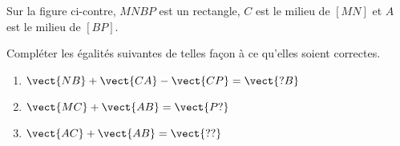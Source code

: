 
\begin{exercice}\label{exosmath-0297}

    \begin{multicols}{2}
        Sur la figure ci-contre, \( MNBP\) est un rectangle, \( C\) est le milieu de \( [MN]\) et $A$ est le milieu de \( [BP]\). 

    \columnbreak


    \begin{center}

    \end{center}

    \end{multicols}
    Compléter les égalités suivantes de telles façon à ce qu'elles soient correctes.
    \begin{multicols}{3}
        \begin{enumerate}
            \item
                \( \vect{ NB }+\vect{ CA }-\vect{ CP }=\vect{ ?B }\)
            \item
                \( \vect{ MC }+\vect{ AB }=\vect{ P? }\)
            \item
                \( \vect{ AC }+\vect{ AB }=\vect{ ?? }\)
        \end{enumerate}
    \end{multicols}

\end{exercice}

